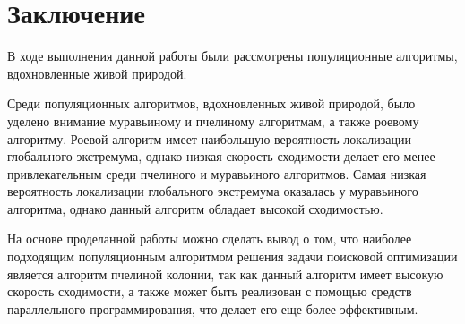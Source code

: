 \chapter*{Заключение}

В ходе выполнения данной работы были рассмотрены популяционные алгоритмы, вдохновленные живой природой.

Среди популяционных алгоритмов, вдохновленных живой природой, было уделено внимание муравьиному и пчелиному алгоритмам, а также роевому алгоритму. Роевой алгоритм имеет наибольшую вероятность локализации глобального экстремума, однако низкая скорость сходимости делает его менее привлекательным среди пчелиного и муравьиного алгоритмов. Самая низкая вероятность локализации глобального экстремума оказалась у муравьиного алгоритма, однако данный алгоритм обладает высокой сходимостью.

На основе проделанной работы можно сделать вывод о том, что наиболее подходящим популяционным алгоритмом решения задачи поисковой оптимизации является алгоритм пчелиной колонии, так как данный алгоритм имеет высокую скорость сходимости, а также может быть реализован с помощью средств параллельного программирования, что делает его еще более эффективным. 
 